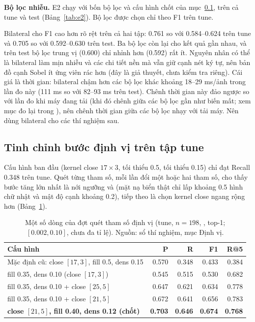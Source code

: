 \textbf{Bộ lọc nhiễu.} E2 chạy  với bốn bộ lọc và cấu hình chốt của mục~\ref{sec:tuning}, trên cả tune và test (Bảng~\ref{tab:e2}). Bộ lọc được chọn chỉ theo F1 trên tune.

\begin{table}[htbp]
\centering
\caption{E2: bộ lọc nhiễu, , dòng ALL. Đậm là bộ lọc được chọn trên tune. Nguồn: .}
\label{tab:e2}
\small

\end{table}

Bilateral cho F1 cao hơn rõ rệt trên cả hai tập: 0.761 so với 0.584--0.624 trên tune và 0.705 so với 0.592--0.630 trên test. Ba bộ lọc còn lại cho kết quả gần nhau, và trên test bộ lọc trung vị (0.600) chỉ nhỉnh hơn  (0.592) rất ít. Nguyên nhân có thể là bilateral làm mịn nhiễu và các chi tiết nền mà vẫn giữ cạnh nét ký tự, nên bản đồ cạnh Sobel ít ứng viên rác hơn (đây là giả thuyết, chưa kiểm tra riêng). Cái giá là thời gian: bilateral chậm hơn các bộ lọc khác khoảng 18--29 ms/ảnh trong lần đo này (111 ms so với 82--93 ms trên test). Chênh thời gian này đảo ngược so với lần đo khi máy đang tải (khi đó chênh giữa các bộ lọc gần như biến mất; xem mục đo lại trong ), nên chênh thời gian giữa các bộ lọc nhạy với tải máy. Nên dùng bilateral cho các thí nghiệm sau.

\subsection{Tinh chỉnh bước định vị trên tập tune}
\label{sec:tuning}

Cấu hình ban đầu (kernel close $17\times 3$,  tối thiểu 0.5,  tối thiểu 0.15) chỉ đạt Recall 0.348 trên tune. Quét từng tham số, mỗi lần đổi một hoặc hai tham số, cho thấy bước tăng lớn nhất là nới ngưỡng  và  (mặt nạ biển thật chỉ lấp khoảng 0.5 hình chữ nhật và mật độ cạnh khoảng 0.2), tiếp theo là chọn kernel close ngang rộng hơn (Bảng~\ref{tab:sweep}).

\begin{table}[htbp]
\centering
\caption{Một số dòng của đợt quét tham số định vị (tune, $n=198$, , top-1;  $[0.002,0.10]$, chưa đa tỉ lệ). Nguồn: sổ thí nghiệm, mục Định vị.}
\label{tab:sweep}
\small
\begin{tabular}{lrrrr}
\toprule
Cấu hình & P & R & F1 & R@5 \\
\midrule
Mặc định cũ: close $[17,3]$, fill 0.5, dens 0.15 & 0.570 & 0.348 & 0.433 & 0.384 \\
fill 0.35, dens 0.10 (close $[17,3]$) & 0.545 & 0.515 & 0.530 & 0.682 \\
fill 0.35, dens 0.10 + close $[25,5]$ & 0.647 & 0.621 & 0.634 & 0.778 \\
fill 0.35, dens 0.10 + close $[21,5]$ & 0.672 & 0.641 & 0.656 & 0.783 \\
\textbf{close $[21,5]$, fill 0.40, dens 0.12 (chốt)} & \textbf{0.703} & \textbf{0.646} & \textbf{0.674} & \textbf{0.768} \\
\bottomrule
\end{tabular}
\end{table}

